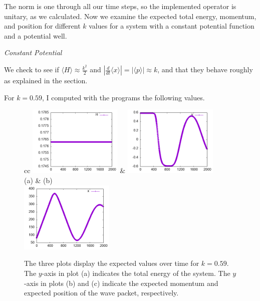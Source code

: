 \documentclass[letterpaper,12pt]{article}
\begin{document}
    The norm is one through all our time steps, so the implemented operator is
    unitary, as we calculated.
    Now we examine the expected total energy, momentum, and position for
    different $k$ values for a system with a constant potential function and a
    potential well.

    \pagebreak

    \begin{center}
        \textit{Constant Potential}
    \end{center}

    We check to see if $\langle H \rangle \approx \frac{k^2}{2}$ and $\left|
    \frac{d}{dt} \langle x \rangle \right| = \left| \langle p \rangle \right|
    \approx k$, and that they behave roughly as explained in the
     section.

    For $k = 0.59$, I computed with the programs
    the following values.

    \begin{figure}[H]
        \centering
        \begin{tabular}{cc}
            \includegraphics[width=0.4\textwidth]{Hc0.59.png}
            &
            \includegraphics[width=0.4\textwidth]{pc0.59.png}
            \\
            (a) & (b)
            \\
            {\includegraphics[width=0.4\textwidth]{xc0.59.png}}
            \\
        \end{tabular}
        \caption[Expected Values over Time for $k = 0.59$]{The three plots
        display the expected values over time for $k =
        0.59$. The $y$-axis in plot (a) indicates the total energy of
        the system. The $y$-axis in plots (b) and (c) indicate the
        expected momentum and expected position of the wave packet,
        respectively.}
        \label{fig:c0.59}
    \end{figure}
\end{document}
